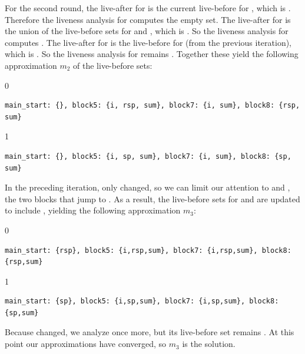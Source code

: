 \documentclass[7x10]{TimesAPriori_MIT}%
\def\xeightysixEd{0}
\def\riscvEd{1}
\def\architecture{1}
\numberwithin{theorem}{chapter}
\numberwithin{definition}{chapter}
\numberwithin{equation}{chapter}
\begin{document}
For the second round, the live-after for  is the
current live-before for , which is .  Therefore
the liveness analysis for  computes the empty set. The
live-after for  is the union of the live-before sets for
 and , which is .
So the liveness analysis for  computes .  The live-after for  is the live-before for
 (from the previous iteration), which is .
So the liveness analysis for  remains .
Together these yield the following approximation $m_2$ of
the live-before sets:
{\if\architecture\xeightysixEd
\begin{center}
  \begin{lstlisting}
main_start: {}, block5: {i, rsp, sum}, block7: {i, sum}, block8: {rsp, sum}
\end{lstlisting}
\end{center}
\fi}
{\if\architecture\riscvEd
\begin{center}
  \begin{lstlisting}
main_start: {}, block5: {i, sp, sum}, block7: {i, sum}, block8: {sp, sum}
\end{lstlisting}
\end{center}
\fi}
In the preceding iteration, only  changed, so we can
limit our attention to  and , the two
blocks that jump to .  As a result, the live-before sets
for  and  are updated to include
\SP, yielding the following approximation $m_3$:
{\if\architecture\xeightysixEd
\begin{center}
  \begin{lstlisting}
main_start: {rsp}, block5: {i,rsp,sum}, block7: {i,rsp,sum}, block8: {rsp,sum}
\end{lstlisting}
\end{center}
\fi}
{\if\architecture\riscvEd
\begin{center}
  \begin{lstlisting}
main_start: {sp}, block5: {i,sp,sum}, block7: {i,sp,sum}, block8: {sp,sum}
\end{lstlisting}
\end{center}
\fi}
Because  changed, we analyze  once more, but
its live-before set remains .  At this point
our approximations have converged, so $m_3$ is the solution.
\end{document}
